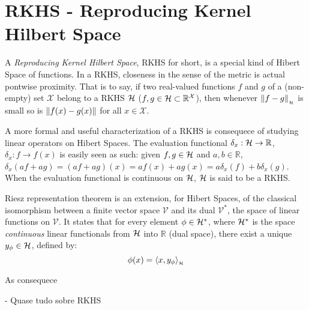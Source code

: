 \section{RKHS - Reproducing Kernel Hilbert Space}

A \textit{Reproducing Kernel Hilbert Space}, RKHS for short, is a special kind
of Hibert Space of functions. In a RKHS, closeness in the sense of the metric is
actual pontwise proximity. That is to say, if two real-valued functions $f$ and
$g$ of a (non-empty) set $\mathcal{X}$ belong to a RKHS $\mathcal{H}$ ($f,g \in \mathcal{H}
\subset \mathbb{R}^\mathcal{X}$), then whenever $\left\lVert f-g\right\rVert_{_{\mathcal{H}}}$ is small so is
$\left\lVert f(x)-g(x)\right\rVert$ for all $x \in \mathcal{X}$\cite{berlinet2011reproducing}.

A more formal and useful characterization of a RKHS is consequece of studying
linear operators on Hibert Spaces. The evaluation functional \(\delta_x: \mathcal{H} \to
\mathbb{R}\), \(\delta_x: f \to f(x)\) is easily seen as such: given \(f,g \in
\mathcal{H}\) and \(a,b \in \mathbb{R}\), \(\delta_x(af+ag)= (af+ag)(x) = af(x)+ag(x) =
a\delta_x(f)+b\delta_x(g)\). When the evaluation functional is continuous on
$\mathcal{H}$, $\mathcal{H}$ is said to be a RKHS.

Riesz representation theorem is an extension, for Hibert Spaces, of the
classical isomorphism between a finite vector space $\mathcal{V}$ and its dual
$\mathcal{V}^*$, the space of linear functions on $\mathcal{V}$. It states that
for every element $\phi \in \mathcal{H}^*$, where $\mathcal{H}^*$ is the space
\textit{continuous} linear functionals from $\mathcal{H}$ into $\mathbb{R}$ (dual
space), there exist a unique $y_\phi \in \mathcal{H}$, defined by:
\begin{equation}
\phi(x)= \langle x,y_\phi\rangle_{_{\mathcal{H}}}
\end{equation}

 As consequece

\citet{berlinet2011reproducing} -  Quase tudo sobre RKHS